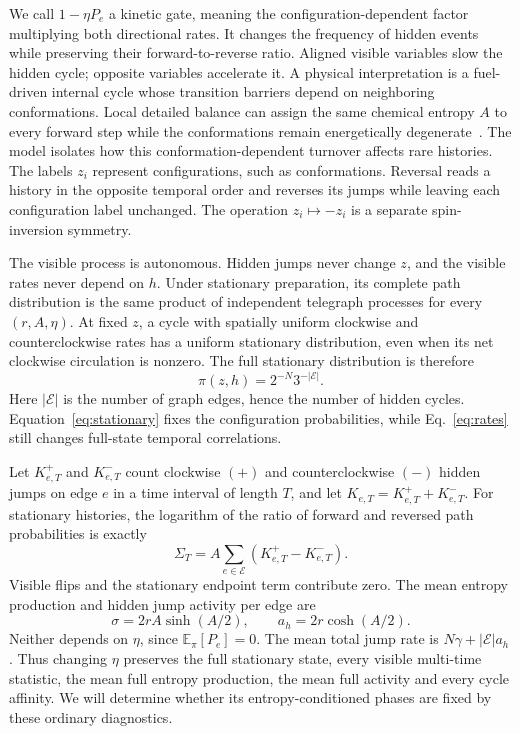 \documentclass[aps,pre,reprint,amsmath,amssymb,longbibliography,floatfix]{revtex4-2}
\newcommand{\E}{\mathbb E}
\begin{document}
We call $1-\eta P_e$ a kinetic gate, meaning the configuration-dependent
factor multiplying both directional rates. It changes the frequency of
hidden events while preserving their forward-to-reverse ratio. Aligned visible variables slow the hidden cycle; opposite
variables accelerate it. A physical interpretation is a fuel-driven
internal cycle whose transition barriers depend on neighboring
conformations. Local detailed balance can assign the same chemical entropy
$A$ to every forward step while the conformations remain energetically
degenerate~\cite{Maes2016Nondissipative}. The model isolates how this conformation-dependent turnover affects rare histories. The labels $z_i$ represent configurations, such as conformations.
Reversal reads a history in the opposite temporal order and reverses
its jumps while leaving each configuration label unchanged.
The operation $z_i\mapsto-z_i$ is a separate spin-inversion symmetry.

The visible process is autonomous. Hidden jumps never change $z$, and the
visible rates never depend on $h$. Under stationary preparation, its complete path
distribution is the same product of independent telegraph processes for
every $(r,A,\eta)$. At fixed $z$, a cycle with spatially uniform clockwise
and counterclockwise rates has a uniform stationary distribution, even
when its net clockwise circulation  is nonzero. The full stationary distribution is therefore
\begin{equation}
 \pi(z,h)=2^{-N}3^{-|\mathcal E|}.
 \label{eq:stationary}
\end{equation}
 Here $|\mathcal E|$ is the number of graph edges, hence the number of
hidden cycles. Equation~\eqref{eq:stationary} fixes the configuration
probabilities, while Eq.~\eqref{eq:rates} still changes full-state temporal correlations.

Let $K_{e,T}^{+}$ and $K_{e,T}^{-}$ count clockwise $(+)$ and counterclockwise $(-)$ hidden jumps on edge
$e$ in a time interval of length $T$, and let
$K_{e,T}=K_{e,T}^{+}+K_{e,T}^{-}$. For stationary histories, the logarithm
of the ratio of forward and reversed path probabilities is exactly
\begin{equation}
 \Sigma_T=A\sum_{e\in\mathcal E}(K_{e,T}^{+}-K_{e,T}^{-}).
 \label{eq:entropy}
\end{equation}
Visible flips and the stationary endpoint term contribute zero.
The mean entropy production and hidden jump activity per edge are
\begin{equation}
 \sigma=2rA\sinh(A/2),\qquad a_h=2r\cosh(A/2).
 \label{eq:means}
\end{equation}
Neither depends on $\eta$, since $\E_\pi\left[P_e\right]=0$.
The mean total jump rate is $N\gamma+|\mathcal E|a_h$.
Thus changing $\eta$ preserves the full stationary state, every visible
multi-time statistic, the mean full entropy production, the mean full
activity and every cycle affinity. We will determine whether its
entropy-conditioned phases are fixed by these ordinary diagnostics.
\end{document}
